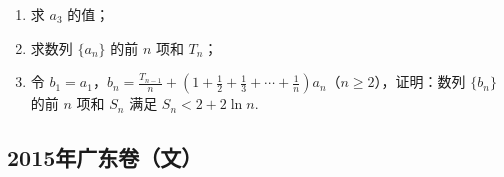 \begin{description}
\begin{enumerate}[leftmargin=5pt]
\begin{enumerate}
\item 求 \(a_3\) 的值；
\item 求数列 \(\{a_n\}\) 的前 \(n\) 项和 \(T_n\)；
\item 令 \(b_1 = a_1\)，\(b_n = \frac{T_{n - 1}}{n} + \left(1 + \frac{1}{2} + \frac{1}{3} + \cdots + \frac{1}{n}\right) a_n\)（\(n \geqslant 2\)），证明：数列 \(\{b_n\}\) 的前 \(n\) 项和 \(S_n\) 满足 \(S_n < 2 + 2 \ln n\).
\end{enumerate}

    \end{enumerate}

\end{description}


\subsection{2015年广东卷（文）}\label{gk:2015年广东卷（文）}

